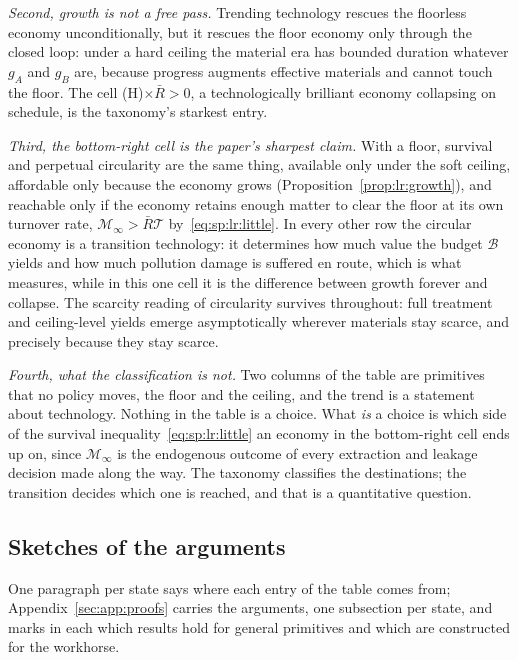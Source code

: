 \emph{Second, growth is not a free pass.} Trending technology rescues the floorless economy unconditionally, but it rescues the floor economy only through the closed loop: under a hard ceiling the material era has bounded duration whatever $g_A$ and $g_B$ are, because progress augments effective materials and cannot touch the floor. The cell (H)$\times\bar R>0$, a technologically brilliant economy collapsing on schedule, is the taxonomy's starkest entry.

\emph{Third, the bottom-right cell is the paper's sharpest claim.} With a floor, survival and perpetual circularity are the same thing, available only under the soft ceiling, affordable only because the economy grows (Proposition~\ref{prop:lr:growth}), and reachable only if the economy retains enough matter to clear the floor at its own turnover rate, $\mathcal M_\infty>\bar R\mathcal T$ by~\eqref{eq:sp:lr:little}. In every other row the circular economy is a transition technology: it determines how much value the budget $\mathcal B$ yields and how much pollution damage is suffered en route, which is what \quantnote{} measures, while in this one cell it is the difference between growth forever and collapse. The scarcity reading of circularity survives throughout: full treatment and ceiling-level yields emerge asymptotically wherever materials stay scarce, and precisely because they stay scarce.

\emph{Fourth, what the classification is not.} Two columns of the table are primitives that no policy moves, the floor and the ceiling, and the trend is a statement about technology. Nothing in the table is a choice. What \emph{is} a choice is which side of the survival inequality~\eqref{eq:sp:lr:little} an economy in the bottom-right cell ends up on, since $\mathcal M_\infty$ is the endogenous outcome of every extraction and leakage decision made along the way. The taxonomy classifies the destinations; the transition decides which one is reached, and that is a quantitative question.

\subsection{Sketches of the arguments}\label{sec:sp:longrun:sketches}

One paragraph per state says where each entry of the table comes from; Appendix~\ref{sec:app:proofs} carries the arguments, one subsection per state, and marks in each which results hold for general primitives and which are constructed for the workhorse.

